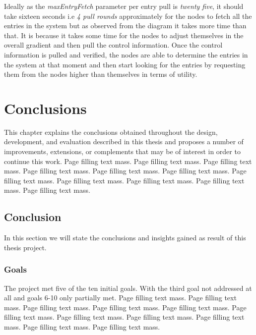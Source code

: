 \documentclass[12pt,a4paper,twoside,openright]{book}
\begin{document}
\par Ideally as the \textit{maxEntryFetch} parameter per entry pull is \textit{twenty five}, it should take sixteen seconds i.e \textit{4 pull rounds} approximately for the nodes to fetch all the entries in the system but as observed from the diagram it takes more time than that. It is because it takes some time for the nodes to adjust themselves in the overall gradient and then pull the control information. Once the control information is pulled and verified, the nodes are able to determine the entries in the system at that moment and then start looking for the entries by requesting them from the nodes higher than themselves in terms of utility.





\chapter{Conclusions}
\label{chap:conclusion}

This chapter explains the conclusions obtained throughout the design,
development, and evaluation described in this thesis and proposes a number of
improvements, extensions, or complements that may be of interest in order to
continue this work. Page filling text mass. Page filling text mass. Page
filling text mass. Page filling text mass. Page filling text mass. Page
filling text mass. Page filling text mass. Page filling text mass. Page
filling text mass. Page filling text mass. Page filling text mass.

\section{Conclusion}


In this section we will state the conclusions and insights gained as result of this thesis project.

\subsection{Goals}
\label{ssec:goals}

The project met five of the ten initial goals. With the third goal not
addressed at all and goals 6-10 only partially met. Page filling text
mass. Page filling text mass. Page filling text mass. Page filling text
mass. Page filling text mass. Page filling text mass. Page filling text
mass. Page filling text mass. Page filling text mass. Page filling text
mass. Page filling text mass.
\end{document}
